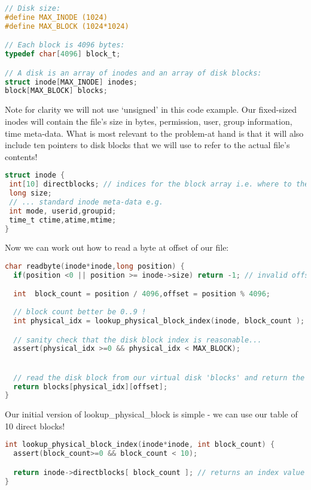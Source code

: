 \begin{lstlisting}[language=C]
// Disk size:
#define MAX_INODE (1024)
#define MAX_BLOCK (1024*1024)

// Each block is 4096 bytes:
typedef char[4096] block_t;

// A disk is an array of inodes and an array of disk blocks:
struct inode[MAX_INODE] inodes;
block[MAX_BLOCK] blocks;
\end{lstlisting}

Note for clarity we will not use `unsigned' in this code example. Our fixed-sized inodes will contain the file's size in bytes, permission, user, group information, time meta-data. What is most relevant to the problem-at hand is that it will also include ten pointers to disk blocks that we will use to refer to the actual file's contents!

\begin{lstlisting}[language=C]
struct inode {
 int[10] directblocks; // indices for the block array i.e. where to the find the file's content
 long size;
 // ... standard inode meta-data e.g.
 int mode, userid,groupid;
 time_t ctime,atime,mtime;
}
\end{lstlisting}

Now we can work out how to read a byte at offset  of our file:

\begin{lstlisting}[language=C]
char readbyte(inode*inode,long position) {
  if(position <0 || position >= inode->size) return -1; // invalid offset

  int  block_count = position / 4096,offset = position % 4096;
  
  // block count better be 0..9 !
  int physical_idx = lookup_physical_block_index(inode, block_count );

  // sanity check that the disk block index is reasonable...
  assert(physical_idx >=0 && physical_idx < MAX_BLOCK);


  // read the disk block from our virtual disk 'blocks' and return the specific byte
  return blocks[physical_idx][offset];
}
\end{lstlisting}

Our initial version of lookup\_physical\_block is simple - we can use our table of 10 direct blocks!

\begin{lstlisting}[language=C]
int lookup_physical_block_index(inode*inode, int block_count) {
  assert(block_count>=0 && block_count < 10);

  return inode->directblocks[ block_count ]; // returns an index value between [0,MAX_BLOCK)
}
\end{lstlisting}

